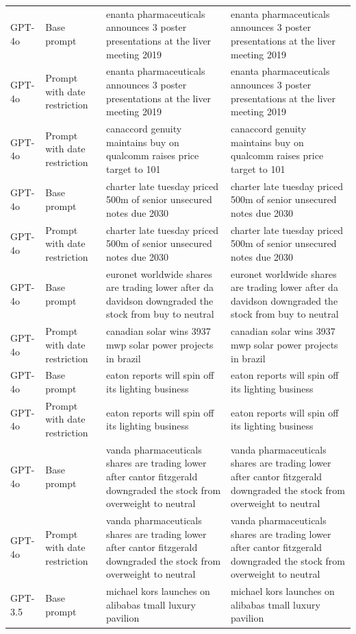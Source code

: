 \begin{longtable}{>{\raggedright\arraybackslash}p{1.4cm}>{\raggedright\arraybackslash}p{1.4cm}>{\raggedright\arraybackslash}p{5.5cm}>{\raggedright\arraybackslash}p{5.5cm}}
GPT-4o & Base prompt & enanta pharmaceuticals announces 3 poster presentations at the liver meeting 2019 & enanta pharmaceuticals announces 3 poster presentations at the liver meeting 2019\\
GPT-4o & Prompt with date restriction & enanta pharmaceuticals announces 3 poster presentations at the liver meeting 2019 & enanta pharmaceuticals announces 3 poster presentations at the liver meeting 2019\\
GPT-4o & Prompt with date restriction & canaccord genuity maintains buy on qualcomm raises price target to 101 & canaccord genuity maintains buy on qualcomm raises price target to 101\\
GPT-4o & Base prompt & charter late tuesday priced 500m of senior unsecured notes due 2030 & charter late tuesday priced 500m of senior unsecured notes due 2030\\
GPT-4o & Prompt with date restriction & charter late tuesday priced 500m of senior unsecured notes due 2030 & charter late tuesday priced 500m of senior unsecured notes due 2030\\
GPT-4o & Base prompt & euronet worldwide shares are trading lower after da davidson downgraded the stock from buy to neutral & euronet worldwide shares are trading lower after da davidson downgraded the stock from buy to neutral\\
GPT-4o & Prompt with date restriction & canadian solar wins 3937 mwp solar power projects in brazil & canadian solar wins 3937 mwp solar power projects in brazil\\
GPT-4o & Base prompt & eaton reports will spin off its lighting business & eaton reports will spin off its lighting business\\
GPT-4o & Prompt with date restriction & eaton reports will spin off its lighting business & eaton reports will spin off its lighting business\\
GPT-4o & Base prompt & vanda pharmaceuticals shares are trading lower after cantor fitzgerald downgraded the stock from overweight to neutral & vanda pharmaceuticals shares are trading lower after cantor fitzgerald downgraded the stock from overweight to neutral\\
GPT-4o & Prompt with date restriction & vanda pharmaceuticals shares are trading lower after cantor fitzgerald downgraded the stock from overweight to neutral & vanda pharmaceuticals shares are trading lower after cantor fitzgerald downgraded the stock from overweight to neutral\\
GPT-3.5 & Base prompt & michael kors launches on alibabas tmall luxury pavilion & michael kors launches on alibabas tmall luxury pavilion\\

\end{longtable}
